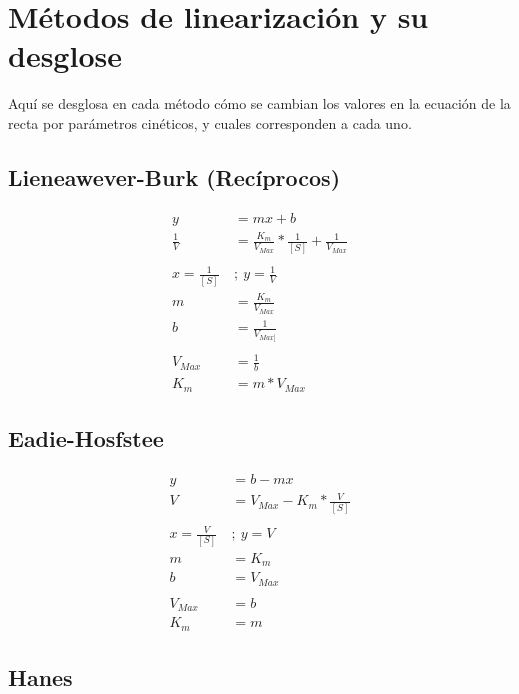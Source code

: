     

\section{Métodos de linearización y su desglose}

Aquí se desglosa en cada método cómo se cambian los valores en la ecuación de la recta por parámetros cinéticos, y cuales corresponden a cada uno.

\subsection{Lieneawever-Burk (Recíprocos)}

\begin{align*}
    y &= mx+b
    \\
    \frac{1}{V} &= \frac{K_{m}}{V_{Max}} * \frac{1}{[S]} + \frac{1}{V_{Max}}
    \\
    \\
    x = \frac{1}{[S]} \ &; \ y = \frac{1}{V}
    \\
    m &= \frac{K_{m}}{V_{Max}}
    \\
    b &= \frac{1}{V_{Max]}}
    \\
    \\
    V_{Max} &= \frac{1}{b}
    \\
    K_{m} &= m * V_{Max}
\end{align*}

\subsection{Eadie-Hosfstee}

\begin{align*}
    y &= b - mx
    \\
    V  &= V_{Max} - K_{m} * \frac{V}{[S]}
    \\
    \\
    x = \frac{V}{[S]} \ &; \ y = V
    \\
    m &= K_{m}
    \\
    b &= V_{Max}
    \\
    \\
    V_{Max} &= b
    \\
    K_{m} &= m
\end{align*}

\subsection{Hanes}

